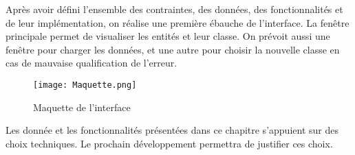 Après avoir défini l'ensemble des contraintes, des données, des fonctionnalités et de leur implémentation, on réalise une première ébauche de l'interface. La fenêtre principale permet de visualiser les entités et leur classe. On prévoit aussi une fenêtre pour charger les données, et une autre pour choisir la nouvelle classe en cas de mauvaise qualification de l'erreur.

\begin{figure}[H]
	\begin{center}
		\texttt{[image: Maquette.png]}  \\
		\caption[Maquette de l'interface]{Maquette de l'interface}
		\label{fig:maquette}
	\end{center}
\end{figure}

Les donnée et les fonctionnalités présentées dans ce chapitre s'appuient sur des choix techniques. Le prochain développement permettra de justifier ces choix.



